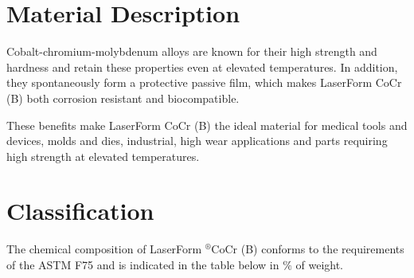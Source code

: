 \documentclass[10pt]{article}
\begin{document}
\section*{Material Description}
Cobalt-chromium-molybdenum alloys are known for their high strength and hardness and retain these properties even at elevated temperatures. In addition, they spontaneously form a protective passive film, which makes LaserForm CoCr (B) both corrosion resistant and biocompatible.

These benefits make LaserForm $\mathrm{CoCr}$ (B) the ideal material for medical tools and devices, molds and dies, industrial, high wear applications and parts requiring high strength at elevated temperatures.

\section*{Classification}
The chemical composition of LaserForm ${ }^{\circledR} \mathrm{CoCr}$ (B) conforms to the requirements of the ASTM F75 and is indicated in the table below in $\%$ of weight.
\end{document}
